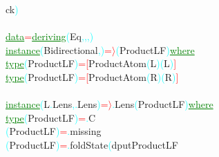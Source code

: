 {\rm{}ck}\textcolor{cyan}{)}\\\\\textcolor{green}{\underline{data}}\hsspace \textcolor{red}{=}\hsspace \textcolor{green}{\underline{deriving}}\hsspace \textcolor{cyan}{(}{\rm{}Eq}\textcolor{cyan}{,}\textcolor{cyan}{,}\textcolor{cyan}{,}\textcolor{cyan}{)}\\\textcolor{green}{\underline{instance}}\hsspace \textcolor{cyan}{(}{\rm{}Bidirectional}\textcolor{cyan}{,}\textcolor{cyan}{)}\hsspace \textcolor{red}{=\ensuremath{\rangle}}\hsspace \textcolor{cyan}{(}{\rm{}ProductLF}\textcolor{cyan}{)}\hsspace \textcolor{green}{\underline{where}}\\\hstab \textcolor{green}{\underline{type}}\hsspace \textcolor{cyan}{(}{\rm{}ProductLF}\textcolor{cyan}{)}\hsspace \textcolor{red}{=}\hsspace \textcolor{red}{[}{\rm{}ProductAtom}\hsspace \textcolor{cyan}{(}{\rm{}L}\textcolor{cyan}{)}\hsspace \textcolor{cyan}{(}{\rm{}L}\textcolor{cyan}{)}\textcolor{red}{]}\\\hstab \textcolor{green}{\underline{type}}\hsspace \textcolor{cyan}{(}{\rm{}ProductLF}\textcolor{cyan}{)}\hsspace \textcolor{red}{=}\hsspace \textcolor{red}{[}{\rm{}ProductAtom}\hsspace \textcolor{cyan}{(}{\rm{}R}\textcolor{cyan}{)}\hsspace \textcolor{cyan}{(}{\rm{}R}\textcolor{cyan}{)}\textcolor{red}{]}\\\\\textcolor{green}{\underline{instance}}\hsspace \textcolor{cyan}{(}{\rm{}L}\textcolor{cyan}{.}{\rm{}Lens}\textcolor{cyan}{,}\textcolor{cyan}{.}{\rm{}Lens}\textcolor{cyan}{)}\hsspace \textcolor{red}{=\ensuremath{\rangle}}\textcolor{cyan}{.}{\rm{}Lens}\hsspace \textcolor{cyan}{(}{\rm{}ProductLF}\textcolor{cyan}{)}\hsspace \textcolor{green}{\underline{where}}\\\hstab \textcolor{green}{\underline{type}}\hsspace \hsspace \textcolor{cyan}{(}{\rm{}ProductLF}\textcolor{cyan}{)}\hsspace \textcolor{red}{=}\textcolor{cyan}{.}{\rm{}C}\\\hsspace \textcolor{cyan}{(}{\rm{}ProductLF}\textcolor{cyan}{)}\hsspace \textcolor{red}{=}\textcolor{cyan}{.}{\rm{}missing}\\\hsspace \hsspace \hsspace \textcolor{cyan}{(}{\rm{}ProductLF}\textcolor{cyan}{)}\hsspace \textcolor{red}{=}\textcolor{cyan}{.}{\rm{}foldState}\hsspace \textcolor{cyan}{(}{\rm{}dputProductLF}\hsspace 